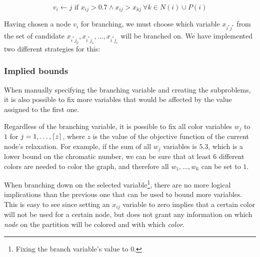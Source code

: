 \begin{equation}
\label{eqn:fixcriteria}
v_i \leftarrow j \text{ if } x_{ij} > 0.7 \wedge x_{ij} > x_{kj}\ \forall k \in N(i) \cup P(i)
\end{equation}

Having chosen a node $v_i$ for branching, we must choose which variable $x_{i^*j^*}$ from the set of candidate $x_{i^*j_0}, x_{i^*j_1}, \ldots, x_{i^*j_c}$ will be branched on. We have implemented two different strategies for this:
\begin{itemize}
\end{itemize}

\subsubsection{Implied bounds}
\label{subsubsec:alg:branch:bounds}

When manually specifying the branching variable and creating the subproblems, it is also possible to fix more variables that would be affected by the value assigned to the first one.

Regardless of the branching variable, it is possible to fix all color variables $w_j$ to $1$ for $j = 1,\ldots,\left\lceil z \right\rceil$, where $z$ is the value of the objective function of the current node's relaxation. For example, if the sum of all $w_j$ variables is $5.3$, which is a lower bound on the chromatic number, we can be sure that at least $6$ different colors are needed to color the graph, and therefore all $w_1,\ldots,w_6$ can be set to $1$.

When branching down on the selected variable\footnote{Fixing the branch variable's value to 0.}, there are no more logical implications than the previous one that can be used to bound more variables. This is easy to see since setting an $x_{ij}$ variable to zero implies that a certain color will not be used for a certain node, but does not grant any information on which \textit{node} on the partition will be colored and with which \textit{color}.


